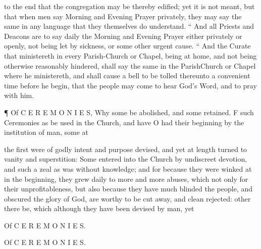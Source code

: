 to the end that the congregation may be thereby edified; yet it is not meant, but that when men say Morning and Evening Prayer privately, they may say the same in any language that they themselves do understand. “ And all Priests and Deacons are to say daily the Morning and Evening Prayer either privately or openly, not being let by sickness, or some other urgent cause. “ And the Curate that ministereth in every Parish-Church or Chapel, being at home, and not being otherwise reasonably hindered, shall say the same in the ParishChurch or Chapel where he ministereth, and shall cause a bell to be tolled thereunto a convenient time before he begin, that the people may come to hear God’s Word, and to pray with him.

¶ Of C E R E M O N I E S, Why some be abolished, and some retained. F such Ceremonies as be used in the Church, and have O had their beginning by the institution of man, some at

the first were of godly intent and purpose devised, and yet at length turned to vanity and superstition: Some entered into the Church by undiscreet devotion, and such a zeal as was without knowledge; and for because they were winked at in the beginning, they grew daily to more and more abuses, which not only for their unprofitableness, but also because they have much blinded the people, and obscured the glory of God, are worthy to be cut away, and clean rejected: other there be, which although they have been devised by man, yet

Of C E R E M O N I E S.

Of C E R E M O N I E S.

